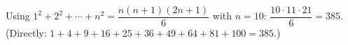 Using $1^2+2^2+\cdots+n^2=\dfrac{n(n+1)(2n+1)}6$ with $n=10$: $\dfrac{10\cdot11\cdot21}6=\boxed{385}$. (Directly: $1+4+9+16+25+36+49+64+81+100=385$.)

